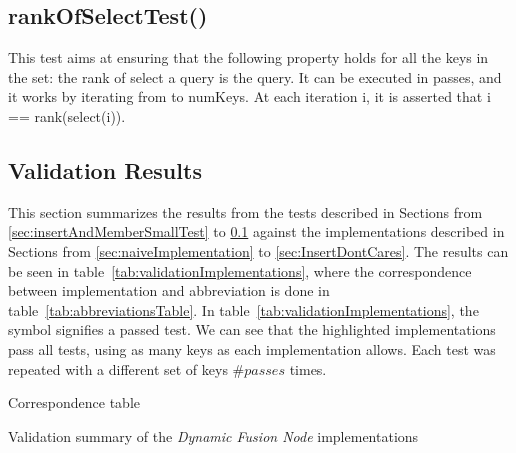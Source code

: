 \subsection{{\ttfamily rankOfSelectTest()}} \label{sec:rankOfSelectTest}

This test aims at ensuring that the following property holds for all the keys in the set: the rank of select a query is the query. It can be executed in passes, and it works by iterating from {} to {\ttfamily numKeys}. At each iteration {\ttfamily i}, it is asserted that {\ttfamily i == rank(select(i))}.


\subsection{Validation Results}

This section summarizes the results from the tests described in Sections from \ref{sec:insertAndMemberSmallTest} to \ref{sec:rankOfSelectTest} against the implementations described in Sections from \ref{sec:naiveImplementation} to \ref{sec:InsertDontCares}.
The results can be seen in table~\ref{tab:validationImplementations}, where the correspondence between implementation and abbreviation is done in table~\ref{tab:abbreviationsTable}.
In table~\ref{tab:validationImplementations}, the \checkmark symbol signifies a passed test.
We can see that the highlighted implementations pass all tests, using as many keys as each implementation allows.
Each test was repeated with a different set of keys \#$passes$ times.

\begin{table}[H]
\centering

\caption{Correspondence table}
\label{tab:abbreviationsTable}
\end{table}

\begin{table}[H]
\centering

\caption{Validation summary of the \textit{Dynamic Fusion Node} implementations}
\label{tab:validationImplementations}
\end{table}
